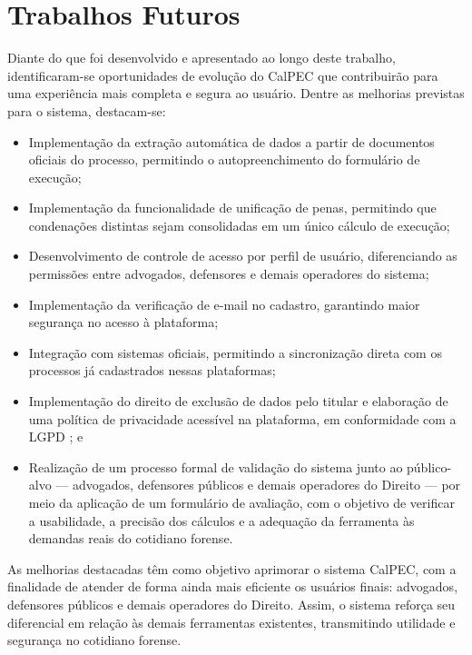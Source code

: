 \chapter{Trabalhos Futuros}

Diante do que foi desenvolvido e apresentado ao longo deste trabalho, 
identificaram-se oportunidades de evolução do CalPEC que contribuirão 
para uma experiência mais completa e segura ao usuário. Dentre as 
melhorias previstas para o sistema, destacam-se:

\begin{itemize}
    \item Implementação da extração automática de dados a partir de 
    documentos oficiais do processo, permitindo o autopreenchimento 
    do formulário de execução;
    \item Implementação da funcionalidade de unificação de penas, 
    permitindo que condenações distintas sejam consolidadas em um 
    único cálculo de execução;
    \item Desenvolvimento de controle de acesso por perfil de usuário, 
    diferenciando as permissões entre advogados, defensores e demais 
    operadores do sistema;
    \item Implementação da verificação de e-mail no cadastro, 
    garantindo maior segurança no acesso à plataforma;
    \item Integração com sistemas oficiais, permitindo a sincronização 
    direta com os processos já cadastrados nessas plataformas;
    \item Implementação do direito de exclusão de dados pelo titular 
    e elaboração de uma política de privacidade acessível na 
    plataforma, em conformidade com a LGPD \cite{lgpd}; e
    \item Realização de um processo formal de validação do sistema 
    junto ao público-alvo — advogados, defensores públicos e demais 
    operadores do Direito — por meio da aplicação de um formulário 
    de avaliação, com o objetivo de verificar a usabilidade, a 
    precisão dos cálculos e a adequação da ferramenta às demandas 
    reais do cotidiano forense.
\end{itemize}

As melhorias destacadas têm como objetivo aprimorar o sistema CalPEC, 
com a finalidade de atender de forma ainda mais eficiente os usuários 
finais: advogados, defensores públicos e demais operadores do Direito. 
Assim, o sistema reforça seu diferencial em relação às demais 
ferramentas existentes, transmitindo utilidade e segurança no 
cotidiano forense.